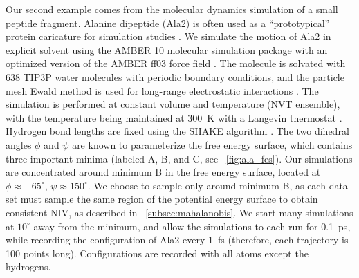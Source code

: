Our second example comes from the molecular dynamics simulation of a small peptide fragment.
%
Alanine dipeptide (Ala2) is often used as a ``prototypical'' protein caricature for simulation studies
\cite{apostolakis1999calculation, bolhuis2000reaction, chekmarev2004long, ma2005automatic, frewen2009exploration, ferguson2011integrating}.
%
We simulate the motion of Ala2 in explicit solvent using the AMBER 10 molecular simulation package \cite{case2008Amber} with an
optimized version \cite{best2009optimized} of the AMBER ff03 force field \cite{duan2003point}.
%
The molecule is solvated with 638 TIP3P water molecules \cite{jorgensen1983comparison}
with periodic boundary conditions, and the particle mesh Ewald method is used for long-range electrostatic interactions \cite{essmann1995smooth}.
%
The simulation is performed at constant volume and temperature (NVT ensemble), with the temperature being maintained at 300~K with a Langevin thermostat \cite{loncharich1992langevin}.
%
Hydrogen bond lengths are fixed using the SHAKE algorithm \cite{ryckaert1977numerical}.
%
The two dihedral angles $\phi$ and $\psi$ are known to parameterize the free energy surface, which contains three important minima (labeled A, B, and C, see \fig~\ref{fig:ala_fes}).
%
Our simulations are concentrated around minimum B in the free energy surface, located at $\phi \approx -65^{\circ}$, $\psi \approx 150^{\circ}$.
%
We choose to sample only around minimum B, as each data set must sample the same region of the potential energy surface to obtain consistent NIV, as described in \sec~\ref{subsec:mahalanobis}.
%
We start many simulations at $10^{\circ}$ away from the minimum, and allow the simulations to each run for 0.1~ps, while recording the configuration of Ala2 every 1~fs (therefore, each trajectory is 100 points long).
%
Configurations are recorded with all atoms except the hydrogens.

